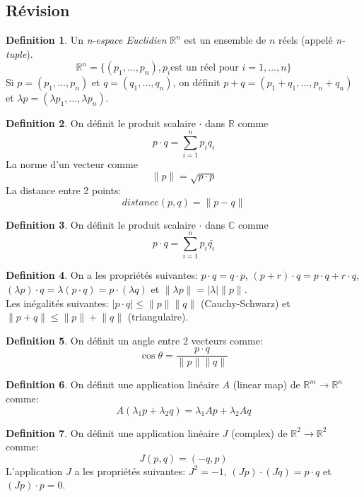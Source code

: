 \documentclass[]{book}
\theoremstyle{definition}
\newtheorem{defn}{Definition}
\newcommand{\bb}[1]{\mathbb{#1}}
\newcommand{\R}{\bb{R}}
\newcommand{\C}{\bb{C}}
\begin{document}
\subsection*{R\'evision}
\begin{defn}
Un \emph{n-espace Euclidien} $\R^n$ est un ensemble de $n$ r\'eels (appel\'e \emph{n-tuple}).
$$
\R^n = \{(p_1,\ldots,p_n), p_i \text{est un r\'eel pour } i = 1,\ldots,n\}
$$ 
Si $p = (p_1, \ldots, p_n)$ et $q = (q_1, \ldots, q_n)$, on d\'efinit $p+q = (p_1+q_1,\ldots,p_n+q_n)$ et $\lambda p = (\lambda p_1, \ldots, \lambda p_n)$.

\end{defn}


\begin{defn}
On d\'efinit le produit scalaire $ \cdot $ dans $\R$ comme 
$$p \cdot q = \sum_{i=1}^{n} p_iq_i$$
La norme d'un vecteur comme
$$\lVert p \rVert = \sqrt{p \cdot p}$$
La distance entre 2 points:
$$distance(p,q) = \lVert p - q \rVert$$
\end{defn}

\begin{defn}
On d\'efinit le produit scalaire $ \cdot $ dans $\C$ comme 
$$p \cdot q = \sum_{i=1}^{n} p_i \bar{q_i}$$
\end{defn}



\begin{defn}
On a les propri\'et\'es suivantes: $p \cdot q = q \cdot p$, $(p+r) \cdot q = p \cdot q + r \cdot q$, $(\lambda p) \cdot q = \lambda(p \cdot q) = p \cdot (\lambda q)$ et $\lVert \lambda p \rVert = \lvert \lambda \rvert \lVert p \rVert$. \\
Les in\'egalit\'es suivantes: $\lvert p \cdot q \rvert \le \lVert p \rVert \lVert q \rVert$ (Cauchy-Schwarz) et $\lVert p+q \rVert \le \lVert p \rVert + \lVert q \rVert$ (triangulaire).   	  
\end{defn}

\begin{defn}
On d\'efinit un angle entre 2 vecteurs comme:
$$\cos \theta = \frac{p \cdot q}{\lVert p \rVert \lVert q \rVert}$$
\end{defn}

\begin{defn}
On d\'efinit une application lin\'eaire $A$ (linear map) de $\R^m \to \R^n$ comme:
$$A(\lambda_1 p + \lambda_2 q) = \lambda_1 Ap + \lambda_2 Aq$$
\end{defn}

\begin{defn}
On d\'efinit une application lin\'eaire $J$ (complex) de $\R^2 \to \R^2$ comme:
$$J(p,q) = (-q,p)$$
L'application $J$ a les propri\'et\'es suivantes: $J^2 = -1$, $(Jp) \cdot (Jq) = p \cdot q$ et $(Jp) \cdot p = 0$. 
\end{defn}
\end{document}
